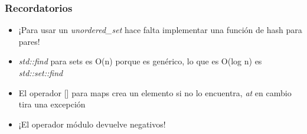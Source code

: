 \subsubsection*{Recordatorios}

\begin{itemize}
    \item ¡Para usar un \textit{unordered\_set} hace falta implementar una función de hash para pares!
    \item \textit{std::find} para sets es O(n) porque es genérico, lo que es O(log n) es \textit{std::set::find}
    \item El operador [] para maps crea un elemento si no lo encuentra, \textit{at} en cambio tira una excepción
    \item ¡El operador módulo devuelve negativos!
\end{itemize}
